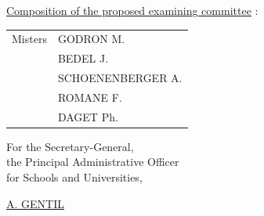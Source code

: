 \uline{Composition of the proposed examining committee} : \begin{tabular}[t]{ll}
Misters & GODRON M.\\
& BEDEL J.\\
& SCHOENENBERGER A.\\
& ROMANE F.\\
& DAGET Ph.
\end{tabular}

\begin{flushright}
For the Secretary-General,\\
the Principal Administrative Officer\\
for Schools and Universities,


\uline{A. GENTIL}
\end{flushright}

